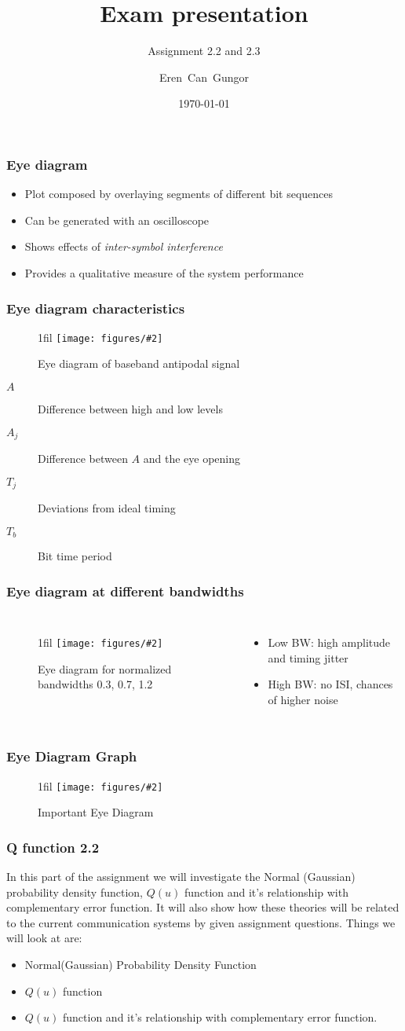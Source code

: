 \documentclass{beamer}
\title{Exam presentation}
\subtitle{Assignment 2.2 and 2.3}
\author[Eren]{Eren~Can~Gungor\inst{1}}
\institute[DTU]
{
	\inst{1}
	Technical University of Denmark\\
	Digital Communication
}
\date{\today}
\makeatletter
\newcommand*{\centerfloat}{%
  \parindent \z@
  \leftskip \z@ \@plus 1fil \@minus \textwidth
  \rightskip\leftskip
  \parfillskip \z@skip}
\newcommand{\fig}[3]{
  \begin{figure}[H]
  \centerfloat
    \texttt{[image: figures/\#2]}
    \caption{#3}
  \end{figure}
}
\makeatother
\begin{document}
\frame{\titlepage}

\begin{frame}
	\frametitle{Eye diagram}
	\begin{itemize}
		\item Plot composed by overlaying segments of different bit sequences
		\item Can be generated with an oscilloscope
		\item Shows effects of \emph{inter-symbol interference}
		\item Provides a qualitative measure of the system performance
	\end{itemize}
\end{frame}

\begin{frame}
	\frametitle{Eye diagram characteristics}
	\fig{9cm}{eye1.png}{Eye diagram of baseband antipodal signal}
	\begin{description}
		\item[$A$] Difference between high and low levels
		\item[$A_j$] Difference between $A$ and the eye opening
		\item[$T_j$] Deviations from ideal timing
		\item[$T_b$] Bit time period
	\end{description}
\end{frame}

\begin{frame}
	\frametitle{Eye diagram at different bandwidths}
	\begin{columns}
			\fig{8cm}{eye2.png}{Eye diagram for normalized bandwidths 0.3, 0.7, 1.2}
			\begin{itemize}
				\item Low BW: high amplitude and timing jitter
				\item High BW: no ISI, chances of higher noise
			\end{itemize}
	\end{columns}
\end{frame}

\begin{frame}
	\frametitle{Eye Diagram Graph}
	\fig{8cm}{important_eye_diag.png}{Important Eye Diagram}
\end{frame}
\begin{frame}
	\frametitle{ Q function 2.2}
In this part of the assignment we will investigate the  Normal (Gaussian) probability density function, $Q(u)$ function and it's relationship with complementary error function. It will also show how these theories will be related to the current communication systems by given assignment questions. Things we will look at are:

	\begin{itemize}
		\item Normal(Gaussian) Probability Density Function
		\item $Q(u)$ function
		\item $Q(u)$ function and it's relationship with complementary error function.
	\end{itemize}
\end{frame}
\end{document}
